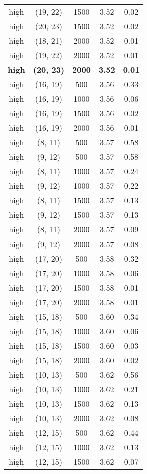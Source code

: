 \begin{tabular}{c c c c c}
high & (19, 22) &  1500 & 3.52 & 0.02 \\
high & (20, 23) &  1500 & 3.52 & 0.02 \\
high & (18, 21) &  2000 & 3.52 & 0.01 \\
high & (19, 22) &  2000 & 3.52 & 0.01 \\
\textbf{high} & \textbf{(20, 23)} & \textbf{ 2000} & \textbf{3.52} & \textbf{0.01} \\
high & (16, 19) &  500 & 3.56 & 0.33 \\
high & (16, 19) &  1000 & 3.56 & 0.06 \\
high & (16, 19) &  1500 & 3.56 & 0.02 \\
high & (16, 19) &  2000 & 3.56 & 0.01 \\
high & (8, 11) &  500 & 3.57 & 0.58 \\
high & (9, 12) &  500 & 3.57 & 0.58 \\
high & (8, 11) &  1000 & 3.57 & 0.24 \\
high & (9, 12) &  1000 & 3.57 & 0.22 \\
high & (8, 11) &  1500 & 3.57 & 0.13 \\
high & (9, 12) &  1500 & 3.57 & 0.13 \\
high & (8, 11) &  2000 & 3.57 & 0.09 \\
high & (9, 12) &  2000 & 3.57 & 0.08 \\
high & (17, 20) &  500 & 3.58 & 0.32 \\
high & (17, 20) &  1000 & 3.58 & 0.06 \\
high & (17, 20) &  1500 & 3.58 & 0.01 \\
high & (17, 20) &  2000 & 3.58 & 0.01 \\
high & (15, 18) &  500 & 3.60 & 0.34 \\
high & (15, 18) &  1000 & 3.60 & 0.06 \\
high & (15, 18) &  1500 & 3.60 & 0.03 \\
high & (15, 18) &  2000 & 3.60 & 0.02 \\
high & (10, 13) &  500 & 3.62 & 0.56 \\
high & (10, 13) &  1000 & 3.62 & 0.21 \\
high & (10, 13) &  1500 & 3.62 & 0.13 \\
high & (10, 13) &  2000 & 3.62 & 0.08 \\
high & (12, 15) &  500 & 3.62 & 0.44 \\
high & (12, 15) &  1000 & 3.62 & 0.13 \\
high & (12, 15) &  1500 & 3.62 & 0.07 \\

\end{tabular}
